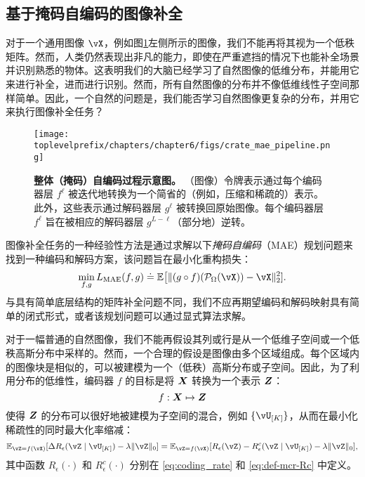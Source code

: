 \documentclass[../../book-main_zh.tex]{subfiles}
\begin{document}
\subsection{基于掩码自编码的图像补全}
对于一个通用图像 $\vX$，例如图\ref{fig:crate_mae_pipeline}左侧所示的图像，我们不能再将其视为一个低秩矩阵。然而，人类仍然表现出非凡的能力，即使在严重遮挡的情况下也能补全场景并识别熟悉的物体。这表明我们的大脑已经学习了自然图像的低维分布，并能用它来进行补全，进而进行识别。然而，所有自然图像的分布并不像低维线性子空间那样简单。因此，一个自然的问题是，我们能否学习自然图像更复杂的分布，并用它来执行图像补全任务？

\begin{figure}[t!]
\begin{center}
  \texttt{[image: \\toplevelprefix/chapters/chapter6/figs/crate\_mae\_pipeline.png]}
\end{center}
\caption{\small \textbf{整体（掩码）自编码过程示意图。} （图像）令牌表示通过每个编码器层 \(f^{\ell}\) 被迭代地转换为一个简省的（例如，压缩和稀疏的）表示。此外，这些表示通过解码器层 \(g^{\ell}\) 被转换回原始图像。每个编码器层 \(f^{\ell}\) 旨在被相应的解码器层 \(g^{L - \ell}\)（部分地）逆转。}
\label{fig:crate_mae_pipeline}
\end{figure}

图像补全任务的一种经验性方法是通过求解以下{\em 掩码自编码}（MAE）规划问题来找到一种编码和解码方案，该问题旨在最小化重构损失：
\begin{equation}\label{eq:mae_loss}
\min_{f, g} L_{\mathrm{MAE}}(f, g) \doteq \mathbb{E}\big[\norm{(g \circ
f)(\mathcal{P}_\Omega(\vX)) - \vX}_{2}^{2}].
\end{equation}
与具有简单底层结构的矩阵补全问题不同，我们不应再期望编码和解码映射具有简单的闭式形式，或者该规划问题可以通过显式算法求解。

对于一幅普通的自然图像，我们不能再假设其列或行是从一个低维子空间或一个低秩高斯分布中采样的。然而，一个合理的假设是图像由多个区域组成。每个区域内的图像块是相似的，可以被建模为一个（低秩）高斯分布或子空间。因此，为了利用分布的低维性，编码器 $f$ 的目标是将 $\bm{X}$ 转换为一个表示 $\bm{Z}$：
\begin{equation}
    f: \bm{X} \mapsto \bm{Z}
\end{equation}
使得 $\bm{Z}$ 的分布可以很好地被建模为子空间的混合，例如 $\{\vU_{[K]}\}$，从而在最小化稀疏性的同时最大化率缩减：
\begin{equation}\label{eq:sparse_rr}
\mathbb{E}_{\vZ = f(\vX)}[\Delta R_{\epsilon}(\vZ \mid \vU_{[K]}) - \lambda
\norm{\vZ}_{0}] = \mathbb{E}_{\vZ = f(\vX)}[R_\epsilon(\vZ) - R^{c}_\epsilon(\vZ \mid
\vU_{[K]}) - \lambda \norm{\vZ}_{0}],
\end{equation}
其中函数 $R_\epsilon(\cdot)$ 和 $R^c_\epsilon(\cdot)$ 分别在 \eqref{eq:coding_rate} 和 \eqref{eq:def-mcr-Rc} 中定义。
\end{document}
